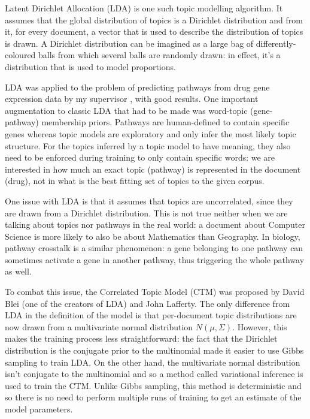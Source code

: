\documentclass[12pt,a4paper,twoside,openright]{report}
\begin{document}
Latent Dirichlet Allocation (LDA) \cite{Blei} is one such topic modelling algorithm. It assumes that the global distribution of topics is a Dirichlet distribution and from it, for every document, a vector that is used to describe the distribution of topics is drawn. A Dirichlet distribution can be imagined as a large bag of differently-coloured balls from which several balls are randomly drawn: in effect, it's a distribution that is used to model proportions.

LDA was applied to the problem of predicting pathways from drug gene expression data by my supervisor \cite{Pratanwanich2014}, with good results. One important augmentation to classic LDA that had to be made was word-topic (gene-pathway) membership priors. Pathways are human-defined to contain specific genes whereas topic models are exploratory and only infer the most likely topic structure. For the topics inferred by a topic model to have meaning, they also need to be enforced during training to only contain specific words: we are interested in how much an exact topic (pathway) is represented in the document (drug), not in what is the best fitting set of topics to the given corpus.

One issue with LDA is that it assumes that topics are uncorrelated, since they are drawn from a Dirichlet distribution. This is not true neither when we are talking about topics nor pathways in the real world: a document about Computer Science is more likely to also be about Mathematics than Geography. In biology, pathway crosstalk is a similar phenomenon: a gene belonging to one pathway can sometimes activate a gene in another pathway, thus triggering the whole pathway as well.

To combat this issue, the Correlated Topic Model (CTM) \cite{2007} was proposed by David Blei (one of the creators of LDA) and John Lafferty. The only difference from LDA in the definition of the model is that per-document topic distributions are now drawn from a multivariate normal distribution $N(\mu, \Sigma)$. However, this makes the training process less straightforward: the fact that the Dirichlet distribution is the conjugate prior to the multinomial made it easier to use Gibbs sampling to train LDA. On the other hand, the multivariate normal distribution isn't conjugate to the multinomial and so a method called variational inference is used to train the CTM. Unlike Gibbs sampling, this method is deterministic and so there is no need to perform multiple runs of training to get an estimate of the model parameters.
\end{document}
